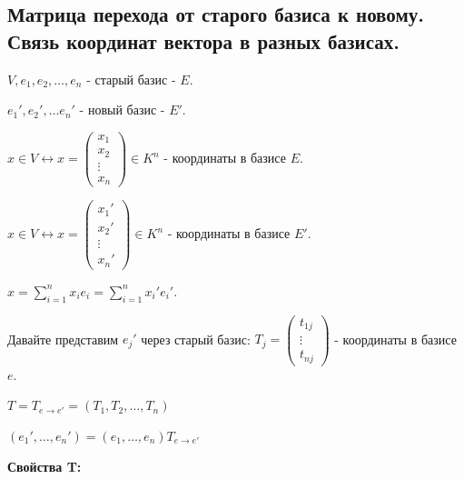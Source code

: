 \documentclass[twoside]{book}
\begin{document}
\subsection{Матрица перехода от старого базиса к новому. Связь координат вектора в разных базисах.}

\(V, e_1, e_2, \ldots , e_n\) - старый базис - \(E\).

\(e_1',e_2',\ldots e_n'\) - новый базис - \(E'\).

\(x\in V \leftrightarrow x = \begin{pmatrix}
    x_1    \\
    x_2    \\
    \vdots \\
    x_n
\end{pmatrix} \in K^n\)  - координаты в базисе \(E\).

\(x\in V \leftrightarrow x = \begin{pmatrix}
    x_1'   \\
    x_2'   \\
    \vdots \\
    x_n'
\end{pmatrix} \in K^n\)  - координаты в базисе \(E'\).

\(x = \sum\limits_{i=1}^n x_i e_i = \sum\limits_{i=1}^n x_i' e_i'\).

Давайте представим \(e_j'\) через старый базис: \(T_j = \begin{pmatrix}
    t_{1j} \\
    \vdots \\
    t_{nj}
\end{pmatrix}\) - координаты в базисе \(e\).

\(T = T_{e \rightarrow e'} = (T_1, T_2, \ldots, T_n)\)

\((e_1', \ldots, e_n') = (e_1, \ldots, e_n) T_{e \rightarrow e'}\)

\textbf{Свойства T:}
\end{document}
